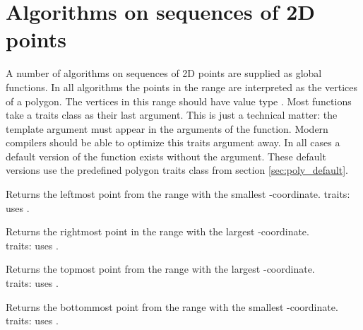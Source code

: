 \section{Algorithms on sequences of 2D points \label{sec:poly_algo}}

A number of algorithms on sequences of 2D points are supplied as global functions.
In all algorithms the points in the range \ccStyle{[first,last)} are interpreted
as the vertices of a polygon. The vertices in this range should have value type
. Most functions take a traits class as their last argument.
This is just a technical matter: the template argument  must
appear in the arguments of the function. Modern compilers should be able to
optimize this traits argument away. In all cases a default version of the function
exists without the  argument. These default versions use the predefined
polygon traits class from section \ref{sec:poly_default}.


{
Returns the leftmost point from the range \ccStyle{[first,last)}
with the smallest -coordinate.
{\sc traits}: uses .
}

{
Returns the rightmost point in the range \ccStyle{[first,last)}
with the largest -coordinate. \\
{\sc traits}: uses .
}

{\samepage
{}
{
Returns the topmost point from the range \ccStyle{[first,last)}
with the largest -coordinate. \\
{\sc traits}: uses .
}
}

{
Returns the bottommost point from the range \ccStyle{[first,last)}
with the smallest -coordinate.\\
{\sc traits}: uses .
}

